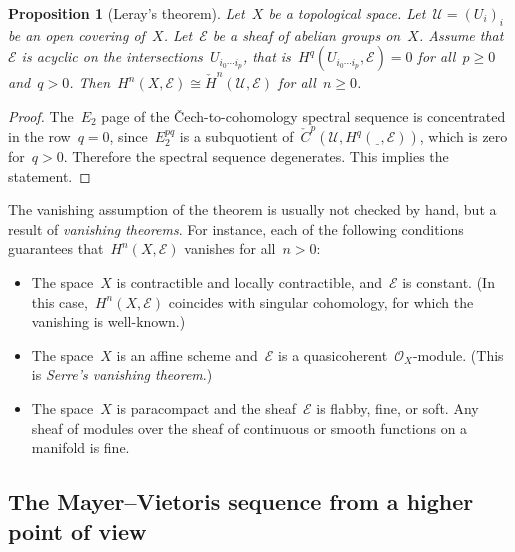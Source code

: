 \documentclass[10pt]{amsart}
\theoremstyle{definition}
\theoremstyle{plain}
\newtheorem{prop}[defn]{Proposition}
\theoremstyle{remark}
\newcommand{\E}{\mathcal{E}}
\renewcommand{\O}{\mathcal{O}}
\newcommand{\U}{\mathcal{U}}
\newcommand{\spot}{\underline{\ \ }}
\begin{document}
\begin{prop}[Leray's theorem]Let~$X$ be a topological space. Let~$\U = (U_i)_i$ be an open
covering of~$X$. Let~$\E$ be a sheaf of abelian groups
on~$X$. Assume that~$\E$ is acyclic on the intersections~$U_{i_0 \cdots i_p}$,
that is~$H^q(U_{i_0 \cdots i_p}, \E) = 0$ for all~$p \geq 0$ and~$q > 0$.
Then~$H^n(X,\E) \cong \check H^n(\U,\E)$ for all~$n \geq 0$.\end{prop}

\begin{proof}The~$E_2$ page of the Čech-to-cohomology spectral sequence is
concentrated in the row~$q = 0$, since~$E_2^{pq}$ is a subquotient of~$\check
C^p(\U, H^q(\spot,\E))$, which is zero for~$q > 0$. Therefore the spectral
sequence degenerates. This implies the statement.
\end{proof}

The vanishing assumption of the theorem is usually not checked by hand, but a
result of \emph{vanishing theorems}. For instance, each of the following
conditions guarantees that~$H^n(X,\E)$ vanishes for all~$n > 0$:
\begin{itemize}
\item The space~$X$ is contractible and locally contractible, and~$\E$ is
constant. (In this case,~$H^n(X,\E)$ coincides with singular cohomology, for
which the vanishing is well-known.)
\item The space~$X$ is an affine scheme and~$\E$ is a
quasicoherent~$\O_X$-module. (This is \emph{Serre's vanishing theorem}.)
\item The space~$X$ is paracompact and the sheaf~$\E$ is flabby, fine, or soft.
Any sheaf of modules over the sheaf of continuous or smooth functions on a
manifold is fine.
\end{itemize}


\subsection{The Mayer--Vietoris sequence from a higher point of view}
\end{document}
